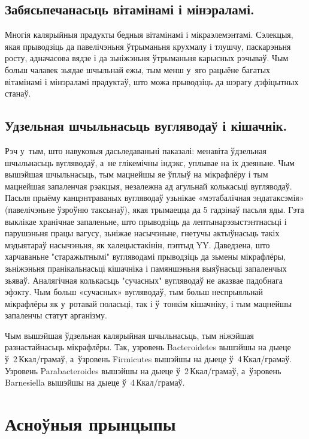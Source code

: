 \subsection{Забясьпечанасьць вітамінамі і мінэраламі.}
Многія калярыйныя прадукты бедныя вітамінамі і мікраэлемэнтамі. Сэлекцыя, якая прыводзіць да павелічэньня ўтрыманьня крухмалу і тлушчу, паскарэньня росту, адначасова вядзе і да зьніжэньня ўтрыманьня карысных рэчываў. Чым больш чалавек зьядае шчыльнай ежы, тым менш у~яго рацыёне багатых вітамінамі і мінэраламі прадуктаў, што можа прыводзіць да шэрагу дэфіцытных станаў.


\subsection{Удзельная шчыльнасьць вугляводаў і кішачнік.}
Рэч у~тым, што навуковыя дасьледаваньні паказалі: менавіта ўдзельная шчыльнасьць вугляводаў, а~не глікемічны індэкс, уплывае на іх дзеяньне. Чым вышэйшая шчыльнасьць, тым мацнейшы яе ўплыў на мікрафлёру і тым мацнейшая запаленчая рэакцыя, незалежна ад агульнай колькасьці вугляводаў. Пасьля прыёму канцэнтраваных вугляводаў узьнікае «мэтабалічная эндатаксэмія» (павелічэньне ўзроўню таксынаў), якая трымаецца да 5 гадзінаў пасьля яды. Гэта выклікае хранічнае запаленьне, што прыводзіць да лептынарэзыстэнтнасьці і парушэньня працы вагусу, зьніжае насычэньне, гнетучы актыўнасьць такіх мэдыятараў насычэньня, як халецыстакінін, пэптыд YY. Даведзена, што харчаваньне "старажытнымі" вугляводамі прыводзіць да зьмены мікрафлёры, зьніжэньня пранікальнасьці кішачніка і памяншэньня выяўнасьці запаленчых зьяваў. Аналягічная колькасьць "сучасных" вугляводаў не аказвае падобнага эфэкту. Чым больш «сучасных» вугляводаў, тым больш неспрыяльнай мікрафлёры як у~ротавай поласьці, так і ў~тонкім кішачніку, і тым мацнейшы запаленчы статут арганізму.

Чым вышэйшая ўдзельная калярыйная шчыльнасьць, тым ніжэйшая разнастайнасьць мікрафлёры. Так, узровень Bacteroidetes вышэйшы на дыеце ў~2\,Ккал/грамаў, а~ўзровень Firmicutes вышэйшы на дыеце ў~4\,Ккал/грамаў. Узровень Parabacteroides вышэйшы на дыеце ў~2\,Ккал/грамаў, а~ўзровень Barnesiella вышэйшы на дыеце ў~4\,Ккал/грамаў.

\section{Асноўныя прынцыпы}

